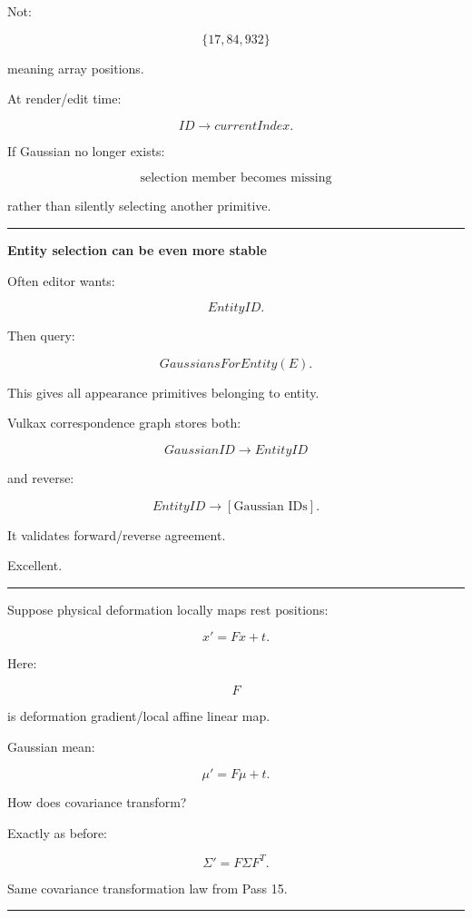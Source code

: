 Not:

\[
\{17,84,932\}
\]

meaning array positions.

At render/edit time:

\[
ID
\rightarrow
currentIndex.
\]

If Gaussian no longer exists:

\[
\boxed{
\text{selection member becomes missing}
}
\]

rather than silently selecting another primitive.

\begin{center}\rule{0.5\linewidth}{0.5pt}\end{center}

\textbf{Entity selection can be even more stable}

Often editor wants:

\[
EntityID.
\]

Then query:

\[
GaussiansForEntity(E).
\]

This gives all appearance primitives belonging to entity.

Vulkax correspondence graph stores both:

\[
GaussianID\rightarrow EntityID
\]

and reverse:

\[
EntityID\rightarrow
[\text{Gaussian IDs}].
\]

It validates forward/reverse agreement.

Excellent.

\begin{center}\rule{0.5\linewidth}{0.5pt}\end{center}

Suppose physical deformation locally maps rest positions:

\[
x'
=
F x+t.
\]

Here:

\[
F
\]

is deformation gradient/local affine linear map.

Gaussian mean:

\[
\boxed{
\mu'
=
F\mu+t.
}
\]

How does covariance transform?

Exactly as before:

\[
\boxed{
\Sigma'
=
F
\Sigma
F^T.
}
\]

Same covariance transformation law from Pass 15.

\begin{center}\rule{0.5\linewidth}{0.5pt}\end{center}

